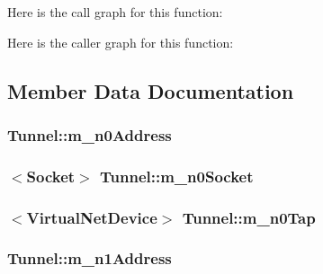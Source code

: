 Here is the call graph for this function\+:




Here is the caller graph for this function\+:




\subsection{Member Data Documentation}
\subsubsection[{\texorpdfstring{m\+\_\+n0\+Address}{m_n0Address}}]{ Tunnel\+::m\+\_\+n0\+Address\hspace{0.3cm}{\ttfamily [private]}}\hypertarget{classTunnel_a6d6a6d6a249c6dbb468dd62da0bd7650}{}\label{classTunnel_a6d6a6d6a249c6dbb468dd62da0bd7650}
\subsubsection[{\texorpdfstring{m\+\_\+n0\+Socket}{m_n0Socket}}]{$<${\bf Socket}$>$ Tunnel\+::m\+\_\+n0\+Socket\hspace{0.3cm}{\ttfamily [private]}}\hypertarget{classTunnel_add805aff2d393a88c0a2b7687bd9672c}{}\label{classTunnel_add805aff2d393a88c0a2b7687bd9672c}
\subsubsection[{\texorpdfstring{m\+\_\+n0\+Tap}{m_n0Tap}}]{$<${\bf Virtual\+Net\+Device}$>$ Tunnel\+::m\+\_\+n0\+Tap\hspace{0.3cm}{\ttfamily [private]}}\hypertarget{classTunnel_aabf848dee0794747c623cee44ef35344}{}\label{classTunnel_aabf848dee0794747c623cee44ef35344}
\subsubsection[{\texorpdfstring{m\+\_\+n1\+Address}{m_n1Address}}]{ Tunnel\+::m\+\_\+n1\+Address\hspace{0.3cm}{\ttfamily [private]}}\hypertarget{classTunnel_a41673b211b64a1dc1bfb8cb6e3f5426d}{}\label{classTunnel_a41673b211b64a1dc1bfb8cb6e3f5426d}
